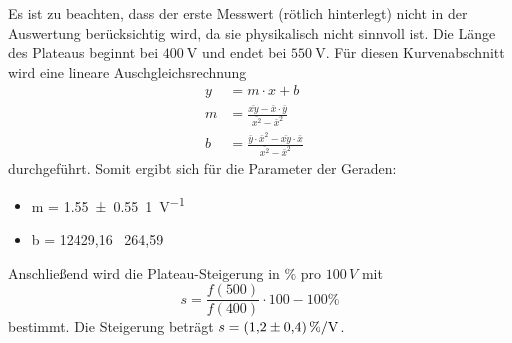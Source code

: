 Es ist zu beachten, dass der erste Messwert (rötlich hinterlegt) nicht in der Auswertung berücksichtig wird,
da sie physikalisch nicht sinnvoll ist.
Die Länge des Plateaus beginnt bei $\SI{400}{\volt}$ und endet bei $\SI{550}{\volt}$. Für diesen Kurvenabschnitt wird eine lineare Auschgleichsrechnung
\begin{align}
  y & = m \cdot x + b \label{eq:9}\\
  m & = \frac {\bar{xy} - \bar{x} \cdot \bar{y}} {\bar{x^2} -\bar{x}^2}&  \label{fel:1}\\
  b & = \frac {\bar{y} \cdot \bar{x}^2 - \bar{xy} \cdot \bar{x}} {\bar{x^2}-\bar{x}^2}& \label{fel:2}
\end{align}
durchgeführt.
Somit ergibt sich für die Parameter der Geraden:
\begin{itemize}
  \item m = \SI{1.55 \pm 0,55}{1\per\volt}
  \item b = 12429,16 \pm \, 264,59
\end{itemize}

Anschließend wird die Plateau-Steigerung in $\%$ pro $100 \, V$ mit
\begin{equation*}
  s = \frac{f(500)}{f(400)} \cdot 100 - 100 \%
\end{equation*}
bestimmt.
Die Steigerung beträgt $s = \SI{1.2 \pm 0.4}{\%\per\volt}$.
